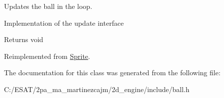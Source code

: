 Updates the ball in the loop. 

Implementation of the update interface

\begin{DoxyReturn}{Returns}
void 
\end{DoxyReturn}


Reimplemented from \hyperlink{class_sprite_a1070fccd6830382b72e3f3a8785afc8c}{Sprite}.



The documentation for this class was generated from the following file\+:\begin{DoxyCompactItemize}
\item 
C\+:/\+E\+S\+A\+T/2pa\+\_\+ma\+\_\+martinezcajm/2d\+\_\+engine/include/ball.\+h\end{DoxyCompactItemize}
